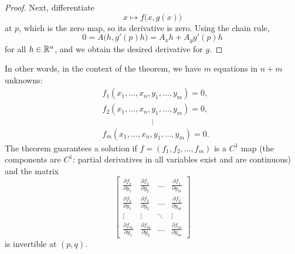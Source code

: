 \begin{proof}
Next, differentiate
\begin{equation*}
x\mapsto f\bigl(x,g(x)\bigr)
\end{equation*}
at $p$,
which is the zero map, so its derivative is zero.
Using the chain rule,
\begin{equation*}
0 = A\bigl(h,g'(p)h\bigr) = A_xh + A_yg'(p)h
\end{equation*}
for all $h \in {\mathbb{R}}^{n}$,
and we obtain the desired derivative for $g$.
\end{proof}

In other words, in the context of the theorem, we have
$m$ equations in $n+m$ unknowns:
\begin{align*}
& f_1 (x_1,\ldots,x_n,y_1,\ldots,y_m) = 0 , \\
& f_2 (x_1,\ldots,x_n,y_1,\ldots,y_m) = 0 , \\
& \qquad \qquad \qquad  \vdots \\
& f_m (x_1,\ldots,x_n,y_1,\ldots,y_m) = 0 .
\end{align*}
The theorem guarantees a solution if 
$f=(f_1,f_2,\ldots,f_m)$ is a $C^1$ map
(the components are $C^1$: partial derivatives in all variables exist
and are continuous) and the matrix
\begin{equation*}
\begin{bmatrix}
\frac{\partial f_1}{\partial y_1}
&
\frac{\partial f_1}{\partial y_2}
& \ldots &
\frac{\partial f_1}{\partial y_m}
\\[6pt]
\frac{\partial f_2}{\partial y_1}
&
\frac{\partial f_2}{\partial y_2}
& \ldots &
\frac{\partial f_2}{\partial y_m}
\\
\vdots & \vdots & \ddots & \vdots
\\
\frac{\partial f_m}{\partial y_1}
&
\frac{\partial f_m}{\partial y_2}
& \ldots &
\frac{\partial f_m}{\partial y_m}
\end{bmatrix}
\end{equation*}
is invertible at $(p,q)$.

